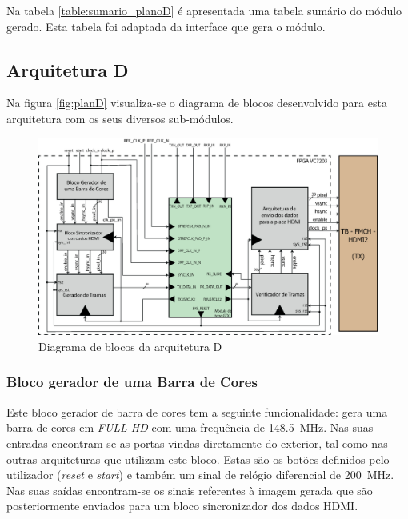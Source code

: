 \documentclass[11pt,a4paper]{article}
\begin{document}
	Na tabela \ref {table:sumario_planoD} é apresentada uma tabela sumário do módulo gerado. Esta tabela foi adaptada da interface que gera o módulo.

	\subsection{Arquitetura D} \label{sub_planD}
	Na figura \ref{fig:planD} visualiza-se o diagrama de blocos desenvolvido para esta arquitetura com os seus diversos sub-módulos. 
	
		\begin{figure}[h!]
			\begin{center}
				\includegraphics[width=1.0\textwidth]{planod} 
				\caption{Diagrama de blocos da arquitetura D}
				\label{fig:planoD}
			\end{center}
		\end{figure}
	
	\subsubsection*{Bloco gerador de uma Barra de Cores} \label{subsub:serial_colorBarGenerator}
	
	Este bloco gerador de barra de cores tem a seguinte funcionalidade: gera uma barra de cores em \textit{FULL HD} com uma frequência de \SI{148.5}{\mega\hertz}. Nas suas entradas encontram-se as portas vindas diretamente do exterior, tal como nas outras arquiteturas que utilizam este bloco. Estas são os botões definidos pelo utilizador (\textit{reset} e \textit{start}) e também um sinal de relógio diferencial de \SI{200}{\mega\hertz}. Nas suas saídas encontram-se os sinais referentes à imagem gerada que são posteriormente enviados para um bloco sincronizador dos dados HDMI.
	
\end{document}
